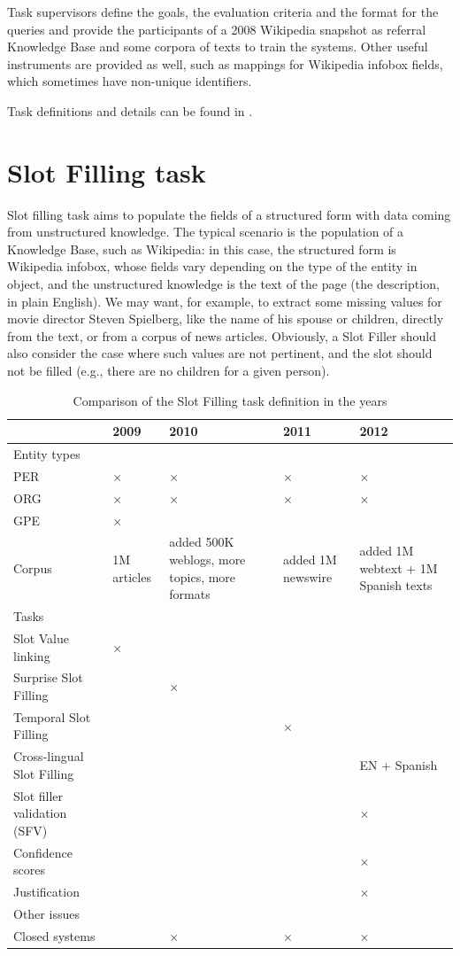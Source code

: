 \documentclass[a4paper,11pt]{report}
\newcommand{\tick}{$\times$}
\begin{document}
Task supervisors define the goals, the evaluation criteria and the format for the queries and provide the participants of a 2008 Wikipedia snapshot as referral Knowledge Base and some corpora of texts to train the systems. Other useful instruments are provided as well, such as mappings for Wikipedia infobox fields, which sometimes have non-unique identifiers.

Task definitions and details can be found in \cite{tac2009, tac2010, tac2011, tac2012}.


\section{Slot Filling task}
Slot filling task aims to populate the fields of a structured form with data coming from unstructured knowledge. The typical scenario is the population of a Knowledge Base, such as Wikipedia: in this case, the structured form is Wikipedia infobox, whose fields vary depending on the type of the entity in object, and the unstructured knowledge is the text of the page (the description, in plain English).
We may want, for example, to extract some missing values for movie director Steven Spielberg, like the name of his spouse or children, directly from the text, or from a corpus of news articles. Obviously, a Slot Filler should also consider the case where such values are not pertinent, and the slot should not be filled (e.g., there are no children for a given person).

\begin{table}
\begin{tabularx}{\linewidth}{lXXXX}
 & 2009 & 2010 & 2011 & 2012 \\
\hline Entity types \\ 
  PER & \tick & \tick & \tick & \tick \\
  ORG & \tick & \tick & \tick & \tick \\
  GPE & \tick & & & \\
\hline Corpus & 1M articles & added 500K weblogs, more topics, more formats & added 1M newswire & added 1M webtext + 1M Spanish texts \\
\hline Tasks\\ 
 Slot Value linking & \tick & & & \\
  Surprise Slot Filling & & \tick & & \\
  Temporal Slot Filling & & & \tick & \\
  Cross-lingual Slot Filling & & & & EN + Spanish \\
  Slot filler validation (SFV) & & & & \tick \\
  Confidence scores & & & & \tick \\
  Justification & & & & \tick \\
\hline Other issues\\ 
 Closed systems & & \tick & \tick & \tick \\
 

\end{tabularx}

\caption{Comparison of the Slot Filling task definition in the years}
\label{tab:sf}
\end{table}
\end{document}
